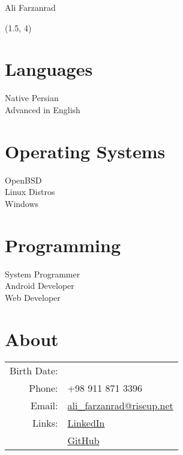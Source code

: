 \documentclass[a4paper,10pt]{article}
\newcommand{\birthdate}{\DTMdate{1990-05-10}}
\begin{document}
{\Huge Ali Farzanrad}

\begin{textblock}{3.8}(1.5, 4)
	\raggedleft
	\section*{Languages}

	Native Persian \\
	Advanced in English

	\section*{Operating Systems}

	OpenBSD \\
	Linux Distros \\
	Windows

	\section*{Programming}

	System Programmer \\
	Android Developer \\
	Web Developer

\end{textblock}

\section*{\color{purple}About}

\begin{tabular}{rl}
Birth Date: & {\birthdate} \\
Phone:	& +98 911 871 3396 \\
Email:	& \href{mailto:ali_farzanrad@riseup.net}
	    {ali\_farzanrad@riseup.net} \\
Links:	& \href{https://linkedin.com/in/ali-farzanrad-0635959b}
	    {LinkedIn} \\
	& \href{https://github.com/fmwviormv}{GitHub}
\end{tabular}
\end{document}

